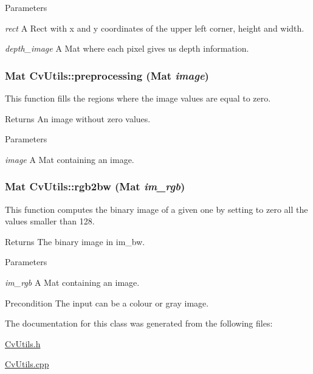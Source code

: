 \begin{DoxyParams}{Parameters}
\item[{\em rect}]A Rect with x and y coordinates of the upper left corner, height and width. \item[{\em depth\_\-image}]A Mat where each pixel gives us depth information. \end{DoxyParams}
\hypertarget{classCvUtils_a47189479acb67a1918f35557fc5906a6}{
\subsubsection[{preprocessing}]{\setlength{\rightskip}{0pt plus 5cm}Mat CvUtils::preprocessing (Mat {\em image})}}
\label{classCvUtils_a47189479acb67a1918f35557fc5906a6}
This function fills the regions where the image values are equal to zero. \begin{DoxyReturn}{Returns}
An image without zero values. 
\end{DoxyReturn}

\begin{DoxyParams}{Parameters}
\item[{\em image}]A Mat containing an image. \end{DoxyParams}
\hypertarget{classCvUtils_aa5bded11699d39af25c420aed2ade0ba}{
\subsubsection[{rgb2bw}]{\setlength{\rightskip}{0pt plus 5cm}Mat CvUtils::rgb2bw (Mat {\em im\_\-rgb})}}
\label{classCvUtils_aa5bded11699d39af25c420aed2ade0ba}
This function computes the binary image of a given one by setting to zero all the values smaller than 128. \begin{DoxyReturn}{Returns}
The binary image in im\_\-bw. 
\end{DoxyReturn}

\begin{DoxyParams}{Parameters}
\item[{\em im\_\-rgb}]A Mat containing an image. \end{DoxyParams}
\begin{DoxyPrecond}{Precondition}
The input can be a colour or gray image. 
\end{DoxyPrecond}


The documentation for this class was generated from the following files:\begin{DoxyCompactItemize}
\item 
\hyperlink{CvUtils_8h}{CvUtils.h}\item 
\hyperlink{CvUtils_8cpp}{CvUtils.cpp}\end{DoxyCompactItemize}
